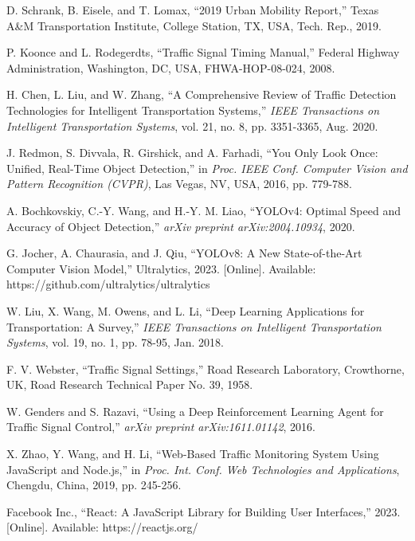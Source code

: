 \documentclass[conference]{IEEEtran}
\begin{document}
\begin{thebibliography}{20}

D. Schrank, B. Eisele, and T. Lomax, ``2019 Urban Mobility Report,'' Texas A\&M Transportation Institute, College Station, TX, USA, Tech. Rep., 2019.

P. Koonce and L. Rodegerdts, ``Traffic Signal Timing Manual,'' Federal Highway Administration, Washington, DC, USA, FHWA-HOP-08-024, 2008.

H. Chen, L. Liu, and W. Zhang, ``A Comprehensive Review of Traffic Detection Technologies for Intelligent Transportation Systems,'' \textit{IEEE Transactions on Intelligent Transportation Systems}, vol. 21, no. 8, pp. 3351-3365, Aug. 2020.

J. Redmon, S. Divvala, R. Girshick, and A. Farhadi, ``You Only Look Once: Unified, Real-Time Object Detection,'' in \textit{Proc. IEEE Conf. Computer Vision and Pattern Recognition (CVPR)}, Las Vegas, NV, USA, 2016, pp. 779-788.

A. Bochkovskiy, C.-Y. Wang, and H.-Y. M. Liao, ``YOLOv4: Optimal Speed and Accuracy of Object Detection,'' \textit{arXiv preprint arXiv:2004.10934}, 2020.

G. Jocher, A. Chaurasia, and J. Qiu, ``YOLOv8: A New State-of-the-Art Computer Vision Model,'' Ultralytics, 2023. [Online]. Available: https://github.com/ultralytics/ultralytics

W. Liu, X. Wang, M. Owens, and L. Li, ``Deep Learning Applications for Transportation: A Survey,'' \textit{IEEE Transactions on Intelligent Transportation Systems}, vol. 19, no. 1, pp. 78-95, Jan. 2018.

F. V. Webster, ``Traffic Signal Settings,'' Road Research Laboratory, Crowthorne, UK, Road Research Technical Paper No. 39, 1958.

W. Genders and S. Razavi, ``Using a Deep Reinforcement Learning Agent for Traffic Signal Control,'' \textit{arXiv preprint arXiv:1611.01142}, 2016.

X. Zhao, Y. Wang, and H. Li, ``Web-Based Traffic Monitoring System Using JavaScript and Node.js,'' in \textit{Proc. Int. Conf. Web Technologies and Applications}, Chengdu, China, 2019, pp. 245-256.

Facebook Inc., ``React: A JavaScript Library for Building User Interfaces,'' 2023. [Online]. Available: https://reactjs.org/


\end{thebibliography}
\end{document}

